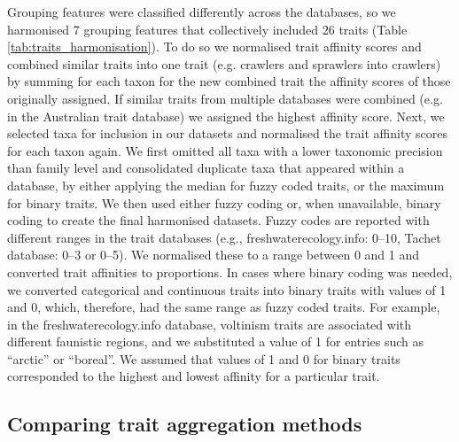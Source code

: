 \documentclass[12pt]{article}
\begin{document}
Grouping features were classified differently across the databases, so we harmonised 7 grouping features that collectively included 26 traits (Table \ref{tab:traits_harmonisation}). To do so we normalised trait affinity scores and combined similar traits into one trait (e.g. crawlers and sprawlers into crawlers) by summing for each taxon for the new combined trait the affinity scores of those originally assigned. If similar traits from multiple databases were combined (e.g. in the Australian trait database) we assigned the highest affinity score. Next, we selected taxa for inclusion in our datasets and normalised the trait affinity scores for each taxon again. We first omitted all taxa with a lower taxonomic precision than family level and consolidated duplicate taxa that appeared within a database, by either applying the median for fuzzy coded traits, or the maximum for binary traits. We then used either fuzzy coding or, when unavailable, binary coding to create the final harmonised datasets. Fuzzy codes are reported with different ranges in the trait databases (e.g., freshwaterecology.info: 0–10, Tachet database: 0–3 or 0–5). We normalised these to a range between 0 and 1 and converted trait affinities to proportions. In cases where binary coding was needed, we converted categorical and continuous traits into binary traits with values of 1 and 0, which, therefore, had the same range as fuzzy coded traits. For example, in the  freshwaterecology.info database, voltinism traits are associated with different faunistic regions, and we substituted a value of 1 for entries such as “arctic” or “boreal”. We assumed that values of 1 and 0 for binary traits corresponded to the highest and lowest affinity for a particular trait.


\subsection*{Comparing trait aggregation methods}
\end{document}
